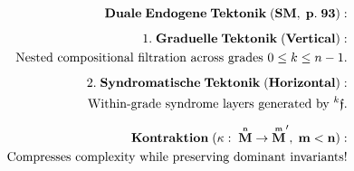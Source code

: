 \documentclass[preview]{standalone}
\begin{document}
\begin{align*}
\special{dvisvgm:raw <g id='unique000'>}\mathbf{Duale\;Endogene\;Tektonik\;(SM,\;p.\;93):}\\[5pt]1.\;\mathbf{Graduelle\;Tektonik\;(Vertical):}\\\;\;\text{Nested compositional filtration across grades }0\le k\le n-1.\\[5pt]2.\;\mathbf{Syndromatische\;Tektonik\;(Horizontal):}\\\;\;\text{Within-grade syndrome layers generated by }{}^k\mathfrak{f}.\\[6pt]\mathbf{Kontraktion\;(\kappa:\;\overset{\scriptscriptstyle n}{\mathbf{M}}\to\overset{\scriptscriptstyle m}{\mathbf{M}}',\;m<n):}\\\text{Compresses complexity while preserving dominant invariants!}\special{dvisvgm:raw </g>}
\end{align*}
\end{document}
